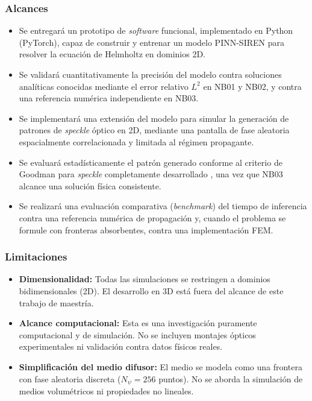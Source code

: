 \subsubsection*{Alcances}
\begin{itemize}
    \item Se entregará un prototipo de \textit{software} funcional, implementado
    en Python (PyTorch), capaz de construir y entrenar un modelo PINN-SIREN para
    resolver la ecuación de Helmholtz en dominios 2D.

    \item Se validará cuantitativamente la precisión del modelo contra soluciones
    analíticas conocidas mediante el error relativo $L^2$ en NB01 y NB02, y contra
    una referencia numérica independiente en NB03.

    \item Se implementará una extensión del modelo para simular la generación
    de patrones de \textit{speckle} óptico en 2D, mediante una pantalla de fase
    aleatoria espacialmente correlacionada y limitada al régimen propagante.

    \item Se evaluará estadísticamente el patrón generado conforme al criterio
    de Goodman para \textit{speckle} completamente desarrollado
    \parencite{goodman2007speckle}, una vez que NB03 alcance una solución física
    consistente.

    \item Se realizará una evaluación comparativa (\textit{benchmark}) del tiempo
    de inferencia contra una referencia numérica de propagación y, cuando el
    problema se formule con fronteras absorbentes, contra una implementación FEM.
\end{itemize}

\subsubsection*{Limitaciones}
\begin{itemize}
    \item \textbf{Dimensionalidad:} Todas las simulaciones se restringen a
    dominios bidimensionales (2D). El desarrollo en 3D está fuera del alcance
    de este trabajo de maestría.

    \item \textbf{Alcance computacional:} Esta es una investigación puramente
    computacional y de simulación. No se incluyen montajes ópticos experimentales
    ni validación contra datos físicos reales.

    \item \textbf{Simplificación del medio difusor:} El medio se modela como
    una frontera con fase aleatoria discreta ($N_\psi = 256$ puntos). No se
    aborda la simulación de medios volumétricos ni propiedades no lineales.
\end{itemize}

